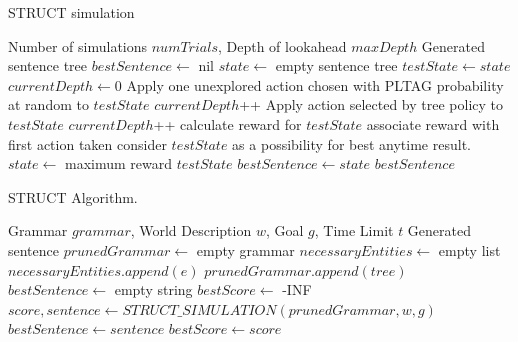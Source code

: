 \begin{algorithm}
\caption{STRUCT simulation}\label{uct-code}
\begin{algorithmic}[1]
\REQUIRE Number of simulations $numTrials$, Depth of lookahead $maxDepth$
\ENSURE Generated sentence tree
\STATE $bestSentence \gets$ nil
\STATE $state \gets$ empty sentence tree
		\STATE $testState \gets state$
		\STATE $currentDepth \gets 0$
			\STATE Apply one unexplored action chosen
                        with PLTAG probability at random to $testState$
			\STATE $currentDepth$++
		\ENDIF
			\STATE Apply action selected by tree
                        policy to $testState$
			\STATE $currentDepth$++
		\ENDWHILE
		\STATE calculate reward for $testState$
		\STATE associate reward with first action taken
			\STATE consider $testState$ as a possibility for best anytime result.
		\ENDIF
	\ENDFOR
	\STATE $state \gets$ maximum reward $testState$
		\STATE $bestSentence \gets state$
	\ENDIF
\ENDWHILE
\RETURN $bestSentence$
\end{algorithmic}
\end{algorithm}

\begin{algorithm}
\caption{STRUCT Algorithm.} \label{struct-alg}
\begin{algorithmic}[1]
\REQUIRE Grammar $grammar$, World Description $w$, Goal $g$, Time Limit $t$
\ENSURE Generated sentence
\STATE $prunedGrammar \gets$ empty grammar
\STATE $necessaryEntities \gets$ empty list
		\STATE $necessaryEntities.append(e)$
	\ENDIF
\ENDFOR
{}
		\STATE $prunedGrammar.append(tree)$
	\ENDIF
\ENDFOR
\STATE $bestSentence \gets$ empty string
\STATE $bestScore \gets$ -INF
	\STATE $score, sentence \gets STRUCT\_SIMULATION(prunedGrammar, w, g)$
		\STATE $bestSentence \gets sentence$
		\STATE $bestScore \gets score$
	\ENDIF
\ENDWHILE
\end{algorithmic}
\end{algorithm}